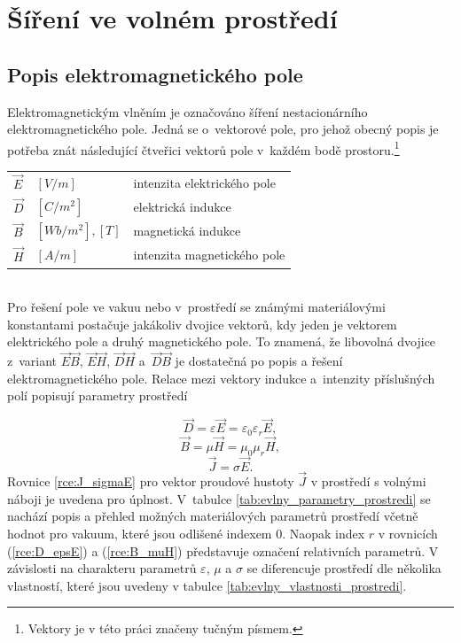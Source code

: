 
\section{Šíření ve volném prostředí} \label{sec:evlny_volne_prostredi}
\subsection{Popis elektromagnetického pole}
Elektromagnetickým vlněním je označováno šíření nestacionárního elektromagnetického pole. Jedná se o~vektorové pole, pro jehož obecný popis je potřeba znát následující čtveřici vektorů pole v~každém bodě prostoru.\footnote{Vektory je v této práci značeny tučným písmem.}\\ 

\begin{tabular}{lll}
$\vec E$ & $\unit{[V/m]}$ & intenzita elektrického pole\\
$\vec D$ & $\unit{[C/m^{2}]}$ & elektrická indukce\\
$\vec B$ & $\unit{[Wb/m^{2}],[T]}$ & magnetická indukce\\
$\vec H$ & $\unit{[A/m]}$ & intenzita magnetického pole\\
\end{tabular}\bigskip \\
Pro řešení pole ve vakuu nebo v~prostředí se známými materiálovými konstantami postačuje jakákoliv dvojice vektorů, kdy jeden je vektorem elektrického pole a druhý magnetického pole. To znamená, že libovolná dvojice z~variant $\vec E\vec B$, $\vec E\vec H$, $\vec D\vec H$ a~$\vec D\vec B$ je dostatečná po popis a řešení elektromagnetického pole.
Relace mezi vektory indukce a~intenzity příslušných polí popisují parametry prostředí 

\begin{equation}
	\vec D = \varepsilon\vec E = \varepsilon_{0}\varepsilon_{r}\vec E,
	\label{rce:D_epsE}
\end{equation}
\begin{equation}
	\vec B = \mu\vec H = \mu_{0}\mu_{r}\vec H,
	\label{rce:B_muH}
\end{equation}
\begin{equation}
	\vec J = \sigma\vec E.
	\label{rce:J_sigmaE}
\end{equation}
Rovnice \ref{rce:J_sigmaE} pro vektor proudové hustoty $\vec J$ v prostředí s volnými náboji je uvedena pro úplnost. V~tabulce \ref{tab:evlny_parametry_prostredi} se nachází popis a přehled možných materiálových parametrů prostředí včetně hodnot pro vakuum, které jsou odlišené indexem $0$. Naopak index $r$ v rovnicích (\ref{rce:D_epsE}) a (\ref{rce:B_muH}) představuje označení relativních parametrů. V závislosti na charakteru parametrů $\varepsilon$, $\mu$ a $\sigma$ se diferencuje prostředí dle několika vlastností, které jsou uvedeny v tabulce \ref{tab:evlny_vlastnosti_prostredi}.

